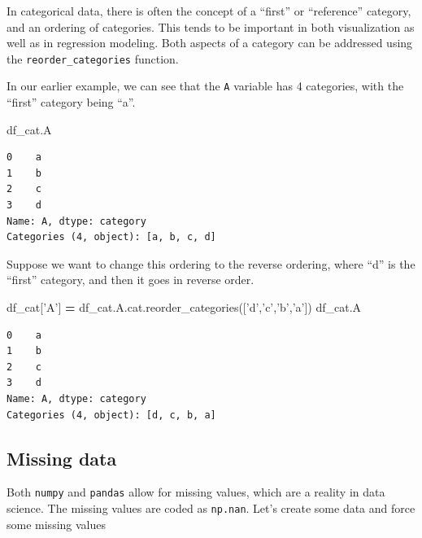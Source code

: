 \documentclass[
  letterpaper,
]{scrbook}
\newenvironment{Shaded}{\begin{snugshade}}{\end{snugshade}}
\newcommand{\NormalTok}[1]{#1}
\newcommand{\OperatorTok}[1]{\textcolor[rgb]{0.81,0.36,0.00}{\textbf{#1}}}
\newcommand{\StringTok}[1]{\textcolor[rgb]{0.31,0.60,0.02}{#1}}
\begin{document}
In categorical data, there is often the concept of a ``first'' or ``reference'' category, and an ordering of categories. This tends to be important in both visualization as well as in regression modeling. Both aspects of a category can be addressed using the \texttt{reorder\_categories} function.

In our earlier example, we can see that the \texttt{A} variable has 4 categories, with the ``first'' category being ``a''.

\begin{Shaded}
\begin{Highlighting}[]
\NormalTok{df_cat.A}
\end{Highlighting}
\end{Shaded}

\begin{verbatim}
0    a
1    b
2    c
3    d
Name: A, dtype: category
Categories (4, object): [a, b, c, d]
\end{verbatim}

Suppose we want to change this ordering to the reverse ordering, where
``d'' is the ``first'' category, and then it goes in reverse order.

\begin{Shaded}
\begin{Highlighting}[]
\NormalTok{df_cat[}\StringTok{'A'}\NormalTok{] }\OperatorTok{=}\NormalTok{ df_cat.A.cat.reorder_categories([}\StringTok{'d'}\NormalTok{,}\StringTok{'c'}\NormalTok{,}\StringTok{'b'}\NormalTok{,}\StringTok{'a'}\NormalTok{])}
\NormalTok{df_cat.A}
\end{Highlighting}
\end{Shaded}

\begin{verbatim}
0    a
1    b
2    c
3    d
Name: A, dtype: category
Categories (4, object): [d, c, b, a]
\end{verbatim}

\hypertarget{missing-data}{%
\subsection{Missing data}\label{missing-data}}

Both \texttt{numpy} and \texttt{pandas} allow for missing values, which are a reality in data science. The missing values are coded as \texttt{np.nan}. Let's create some data and force some missing values
\end{document}
